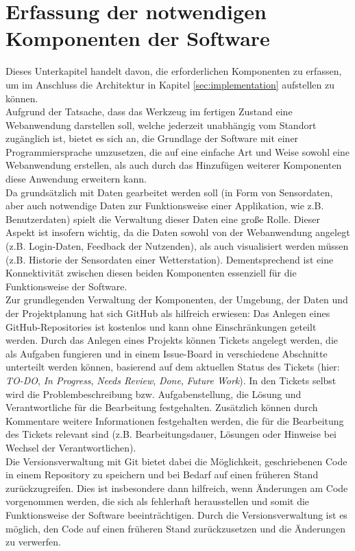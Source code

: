 \section{Erfassung der notwendigen Komponenten der Software}
Dieses Unterkapitel handelt davon, die erforderlichen Komponenten zu erfassen, um im Anschluss die Architektur in Kapitel \ref{sec:implementation} aufstellen zu können. \\ Aufgrund der Tatsache, dass das Werkzeug im fertigen Zustand eine Webanwendung darstellen soll, welche jederzeit unabhängig vom Standort zugänglich ist, bietet es sich an, die Grundlage der Software mit einer Programmiersprache umzusetzen, die auf eine einfache Art und Weise sowohl eine Webanwendung erstellen, als auch durch das Hinzufügen weiterer Komponenten diese Anwendung erweitern kann. \\ Da grundsätzlich mit Daten gearbeitet werden soll (in Form von Sensordaten, aber auch notwendige Daten zur Funktionsweise einer Applikation, wie z.B. Benutzerdaten) spielt die Verwaltung dieser Daten eine große Rolle. Dieser Aspekt ist insofern wichtig, da die Daten sowohl von der Webanwendung angelegt (z.B. Login-Daten, Feedback der Nutzenden), als auch visualisiert werden müssen (z.B. Historie der Sensordaten einer Wetterstation). Dementsprechend ist eine Konnektivität zwischen diesen beiden Komponenten essenziell für die Funktionsweise der Software. \\ Zur grundlegenden Verwaltung der Komponenten, der Umgebung, der Daten und der Projektplanung hat sich GitHub als hilfreich erwiesen: Das Anlegen eines GitHub-Repositories ist kostenlos und kann ohne Einschränkungen geteilt werden. Durch das Anlegen eines Projekts können Tickets angelegt werden, die als Aufgaben fungieren und in einem Issue-Board in verschiedene Abschnitte unterteilt werden können, basierend auf dem aktuellen Status des Tickets (hier: \textit{TO-DO}, \textit{In Progress}, \textit{Needs Review}, \textit{Done}, \textit{Future Work}). In den Tickets selbst wird die Problembeschreibung bzw. Aufgabenstellung, die Lösung und Verantwortliche für die Bearbeitung festgehalten. Zusätzlich können durch Kommentare weitere Informationen festgehalten werden, die für die Bearbeitung des Tickets relevant sind (z.B. Bearbeitungsdauer, Lösungen oder Hinweise bei Wechsel der Verantwortlichen). \\ Die Versionsverwaltung mit Git bietet dabei die Möglichkeit, geschriebenen Code in einem Repository zu speichern und bei Bedarf auf einen früheren Stand zurückzugreifen. Dies ist insbesondere dann hilfreich, wenn Änderungen am Code vorgenommen werden, die sich als fehlerhaft herausstellen und somit die Funktionsweise der Software beeinträchtigen. Durch die Versionsverwaltung ist es möglich, den Code auf einen früheren Stand zurückzusetzen und die Änderungen zu verwerfen. 

